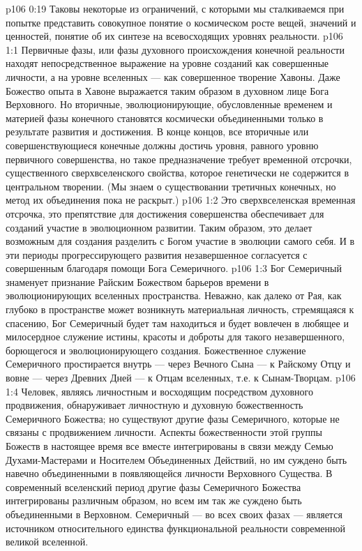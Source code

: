 \vs p106 0:19 \pc Таковы некоторые из ограничений, с которыми мы сталкиваемся при попытке представить совокупное понятие о космическом росте вещей, значений и ценностей, понятие об их синтезе на всевосходящих уровнях реальности.
\vs p106 1:1 Первичные фазы, или фазы духовного происхождения конечной реальности находят непосредственное выражение на уровне созданий как совершенные личности, а на уровне вселенных --- как совершенное творение Хавоны. Даже Божество опыта в Хавоне выражается таким образом в духовном лице Бога Верховного. Но вторичные, эволюционирующие, обусловленные временем и материей фазы конечного становятся космически объединенными только в результате развития и достижения. В конце концов, все вторичные или совершенствующиеся конечные должны достичь уровня, равного уровню первичного совершенства, но такое предназначение требует временной отсрочки, существенного сверхвселенского свойства, которое генетически не содержится в центральном творении. (Мы знаем о существовании третичных конечных, но метод их объединения пока не раскрыт.)
\vs p106 1:2 Это сверхвселенская временная отсрочка, это препятствие для достижения совершенства обеспечивает для созданий участие в эволюционном развитии. Таким образом, это делает возможным для создания разделить с Богом участие в эволюции самого себя. И в эти периоды прогрессирующего развития незавершенное согласуется с совершенным благодаря помощи Бога Семеричного.
\vs p106 1:3 Бог Семеричный знаменует признание Райским Божеством барьеров времени в эволюционирующих вселенных пространства. Неважно, как далеко от Рая, как глубоко в пространстве может возникнуть материальная личность, стремящаяся к спасению, Бог Семеричный будет там находиться и будет вовлечен в любящее и милосердное служение истины, красоты и доброты для такого незавершенного, борющегося и эволюционирующего создания. Божественное служение Семеричного простирается внутрь --- через Вечного Сына --- к Райскому Отцу и вовне --- через Древних Дней --- к Отцам вселенных, т.е. к Сынам\hyp{}Творцам.
\vs p106 1:4 Человек, являясь личностным и восходящим посредством духовного продвижения, обнаруживает личностную и духовную божественность Семеричного Божества; но существуют другие фазы Семеричного, которые не связаны с продвижением личности. Аспекты божественности этой группы Божеств в настоящее время все вместе интегрированы в связи между Семью Духами\hyp{}Мастерами и Носителем Объединенных Действий, но им суждено быть навечно объединенными в появляющейся личности Верховного Существа. В современный вселенский период другие фазы Семеричного Божества интегрированы различным образом, но всем им так же суждено быть объединенными в Верховном. Семеричный --- во всех своих фазах --- является источником относительного единства функциональной реальности современной великой вселенной.
